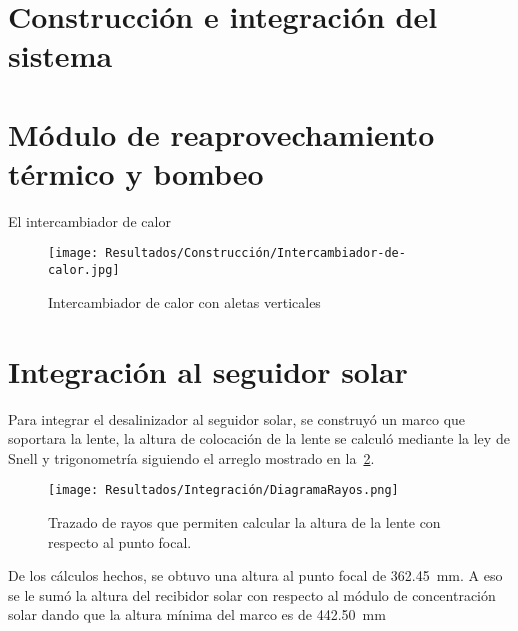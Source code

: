 	
	\section{Construcción e integración del sistema}
		
		\section{Módulo de reaprovechamiento térmico y bombeo}
		
			El intercambiador de calor 
			
			\begin{figure}[H]
				\centering
				\texttt{[image: Resultados/Construcción/Intercambiador-de-calor.jpg]}
				\caption{Intercambiador de calor con aletas verticales}
				\label{fig:Intercambiador-de-calor.jpeg}
			\end{figure}
		
	
	\section{Integración al seguidor solar}
	
		Para integrar el desalinizador al seguidor solar, se construyó un marco que soportara la lente, la altura de colocación de la lente se calculó mediante la ley de Snell y trigonometría siguiendo el arreglo mostrado en la~\cref{fig:DiagramaRayos}.
		
		\begin{figure}[H]
			\centering
			\texttt{[image: Resultados/Integración/DiagramaRayos.png]}
			\caption{Trazado de rayos que permiten calcular la altura de la lente con respecto al punto focal.}
			\label{fig:DiagramaRayos}
		\end{figure}
		
		
		De los cálculos hechos, se obtuvo una altura al punto focal de \qty{362.45}{\mm}. A eso se le sumó la altura del recibidor solar con respecto al módulo de concentración solar dando que la altura mínima del marco es de \qty{442.50}{\mm}
		
			
			


			
			
			
			